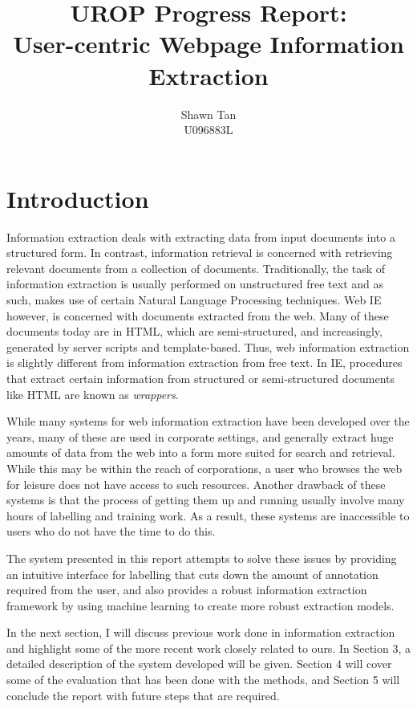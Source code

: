 \documentclass[a4paper,12pt]{article}
\title{UROP Progress Report:\\User-centric Webpage Information Extraction}
\date{}
\author{Shawn Tan\\U096883L}
\begin{document}

\maketitle

\section{Introduction}
Information extraction deals with extracting data from input documents into a structured form. In contrast, information retrieval is concerned with retrieving relevant documents from a collection of documents. Traditionally, the task of information extraction is usually performed on unstructured free text and as such, makes use of certain Natural Language Processing techniques. Web IE however, is concerned with documents extracted from the web. Many of these documents today are in HTML, which are semi-structured, and increasingly, generated by server scripts and template-based. Thus, web information extraction is slightly different from information extraction from free text. In IE, procedures that extract certain information from structured or semi-structured documents like HTML are known as \textit{wrappers}. 

While many systems for web information extraction have been developed over the years, many of these are used in corporate settings, and generally extract huge amounts of data from the web into a form more suited for search and retrieval. While this may be within the reach of corporations, a user who browses the web for leisure does not have access to such resources. Another drawback of these systems is that the process of getting them up and running usually involve many hours of labelling and training work. As a result, these systems are inaccessible to users who do not have the time to do this.
	
The system presented in this report attempts to solve these issues by providing an intuitive interface for labelling that cuts down the amount of annotation required from the user, and also provides a robust information extraction framework by using machine learning to create more robust extraction models.

In the next section, I will discuss previous work done in information extraction and highlight some of the more recent work closely related to ours. In Section 3, a detailed description of the system developed will be given. Section 4 will cover some of the evaluation that has been done with the methods, and Section 5 will conclude the report with future steps that are required.
\end{document}
